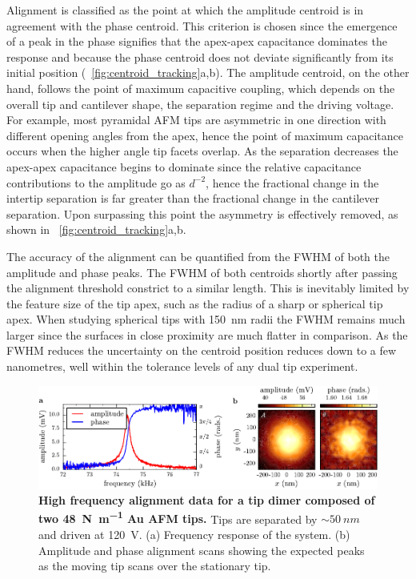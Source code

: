 \documentclass{article}
\begin{document}
Alignment is classified as the point at which the amplitude centroid is in agreement with the phase centroid. This criterion is chosen since the emergence of a peak in the phase signifies that the apex-apex capacitance dominates the response and because the phase centroid does not deviate significantly from its initial position (\figurename~\ref{fig:centroid_tracking}a,b). The amplitude centroid, on the other hand, follows the point of maximum capacitive coupling, which depends on the overall tip and cantilever shape, the separation regime and the driving voltage. For example, most pyramidal AFM tips are asymmetric in one direction with different opening angles from the apex, hence the point of maximum capacitance occurs when the higher angle tip facets overlap. As the separation decreases the apex-apex capacitance begins to dominate since the relative capacitance contributions to the amplitude go as $d^{-2}$, hence the fractional change in the intertip separation is far greater than the fractional change in the cantilever separation. Upon surpassing this point the asymmetry is effectively removed, as shown in \figurename~\ref{fig:centroid_tracking}a,b.

The accuracy of the alignment can be quantified from the FWHM of both the amplitude and phase peaks. The FWHM of both centroids shortly after passing the alignment threshold constrict to a similar length. This is inevitably limited by the feature size of the tip apex, such as the radius of a sharp or spherical tip apex. When studying spherical tips with \SI{150}{nm} radii the FWHM remains much larger since the surfaces in close proximity are much flatter in comparison. As the FWHM reduces the uncertainty on the centroid position reduces down to a few nanometres, well within the tolerance levels of any dual tip experiment.

\begin{figure}[bt]
\centering
\includegraphics{figures/hf_alignment_data}
\caption[High frequency alignment data for a tip dimer composed of two \SI{48}{\newton\per\metre} Au AFM tips]{\textbf{High frequency alignment data for a tip dimer composed of two \SI{48}{\newton\per\metre} Au AFM tips.} Tips are separated by $\sim\SI{50}{nm}$ and driven at \SI{120}{V}. (a) Frequency response of the system. (b) Amplitude and phase alignment scans showing the expected peaks as the moving tip scans over the stationary tip.}
\label{fig:hf_alignment_data} 
\end{figure}
\end{document}
